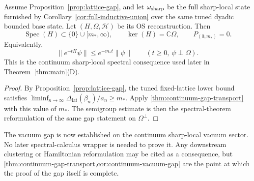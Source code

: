 \begin{corollary}\label{cor:continuum-vacuum-gap}
Assume Proposition~\ref{prop:lattice-gap}, and let $\omega_{\mathrm{sharp}}$ be the full sharp-local state furnished by Corollary~\ref{cor:full-inductive-union} over the same tuned dyadic bounded base state. Let $(H,\Omega,\mathcal H)$ be its OS reconstruction. Then
\[
\operatorname{Spec}(H)\subset \{0\}\cup[m_*,\infty),
\qquad
\ker(H)=\mathbb C\Omega,
\qquad
P_{(0,m_*)}=0.
\]
Equivalently,
\[
\|e^{-tH}\psi\|\le e^{-m_* t}\|\psi\|
\qquad (t\ge 0,\ \psi\perp \Omega).
\]
This is the continuum sharp-local spectral consequence used later in Theorem~\ref{thm:main}(D).
\end{corollary}

\begin{proof}
By Proposition~\ref{prop:lattice-gap}, the tuned fixed-lattice lower bound satisfies $\liminf_{n\to\infty}\Delta_{\mathrm{lat}}(\beta_n)/a_n\ge m_*$. Apply \cref{thm:continuum-gap-transport} with this value of $m_*$. The semigroup estimate is then the spectral-theorem reformulation of the same gap statement on $\Omega^{\perp}$.
\end{proof}

The vacuum gap is now established on the continuum sharp-local vacuum sector. No later spectral-calculus wrapper is needed to prove it. Any downstream clustering or Hamiltonian reformulation may be cited as a consequence, but \cref{thm:continuum-gap-transport,cor:continuum-vacuum-gap} are the point at which the proof of the gap itself is complete.

